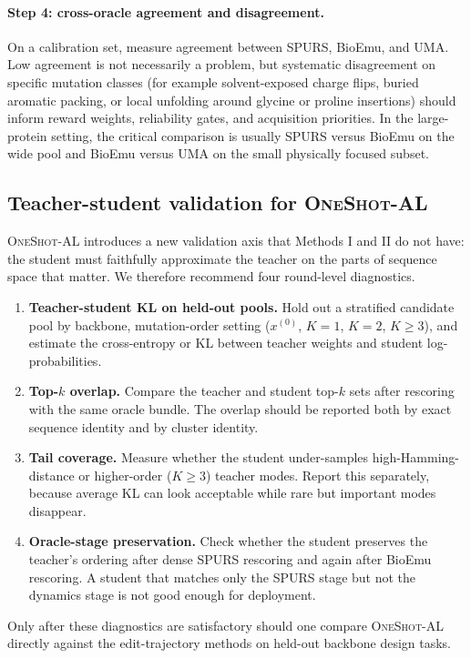 \documentclass[11pt]{article}
\newcommand{\methodIII}{\textsc{OneShot-AL}}
\begin{document}
\paragraph{Step 4: cross-oracle agreement and disagreement.}
On a calibration set, measure agreement between SPURS, BioEmu, and UMA. Low agreement is not necessarily a problem, but systematic disagreement on specific mutation classes (for example solvent-exposed charge flips, buried aromatic packing, or local unfolding around glycine or proline insertions) should inform reward weights, reliability gates, and acquisition priorities. In the large-protein setting, the critical comparison is usually SPURS versus BioEmu on the wide pool and BioEmu versus UMA on the small physically focused subset.

\subsection{Teacher-student validation for \methodIII{}}

\methodIII{} introduces a new validation axis that Methods I and II do not have: the student must faithfully approximate the teacher on the parts of sequence space that matter. We therefore recommend four round-level diagnostics.
\begin{enumerate}[leftmargin=1.5em]
    \item \textbf{Teacher-student KL on held-out pools.} Hold out a stratified candidate pool by backbone, mutation-order setting ($x^{(0)}$, $K=1$, $K=2$, $K\ge 3$), and estimate the cross-entropy or KL between teacher weights and student log-probabilities.
    \item \textbf{Top-$k$ overlap.} Compare the teacher and student top-$k$ sets after rescoring with the same oracle bundle. The overlap should be reported both by exact sequence identity and by cluster identity.
    \item \textbf{Tail coverage.} Measure whether the student under-samples high-Hamming-distance or higher-order ($K\ge 3$) teacher modes. Report this separately, because average KL can look acceptable while rare but important modes disappear.
    \item \textbf{Oracle-stage preservation.} Check whether the student preserves the teacher's ordering after dense SPURS rescoring and again after BioEmu rescoring. A student that matches only the SPURS stage but not the dynamics stage is not good enough for deployment.
\end{enumerate}
Only after these diagnostics are satisfactory should one compare \methodIII{} directly against the edit-trajectory methods on held-out backbone design tasks.
\end{document}
